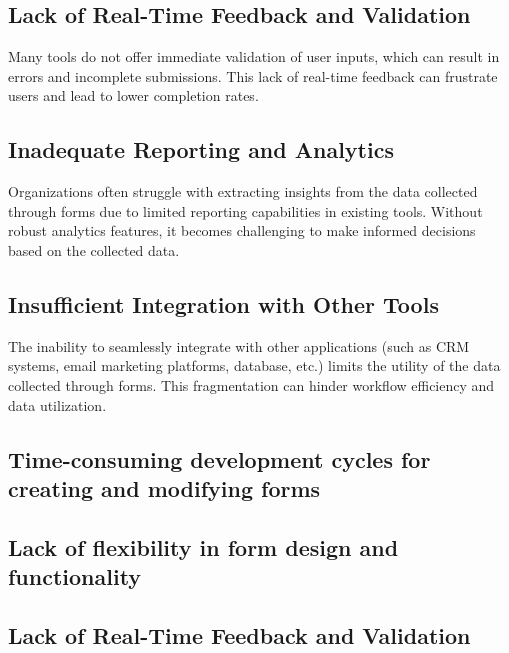 \subsection{Lack of Real-Time Feedback and Validation}
Many tools do not offer immediate validation of user inputs, which can result in errors and incomplete submissions. This lack of real-time feedback can frustrate users and lead to lower completion rates.

\subsection{Inadequate Reporting and Analytics}
Organizations often struggle with extracting insights from the data collected through forms due to limited reporting capabilities in existing tools. Without robust analytics features, it becomes challenging to make informed decisions based on the collected data.

\subsection{Insufficient Integration with Other Tools}
The inability to seamlessly integrate with other applications (such as CRM systems, email marketing platforms, database, etc.) limits the utility of the data collected through forms. This fragmentation can hinder workflow efficiency and data utilization.

\subsection{Time-consuming development cycles for creating and modifying forms}

\subsection{Lack of flexibility in form design and functionality}

\subsection{Lack of Real-Time Feedback and Validation}


